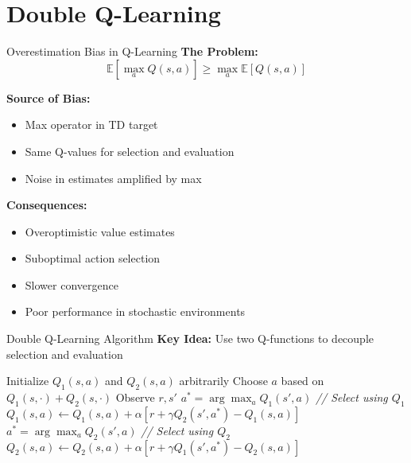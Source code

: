 \documentclass[aspectratio=169,10pt]{beamer}
\begin{document}
\section{Double Q-Learning}

\begin{frame}{Overestimation Bias in Q-Learning}
\textbf{The Problem:}
$$\mathbb{E}[\max_a Q(s,a)] \geq \max_a \mathbb{E}[Q(s,a)]$$

\textbf{Source of Bias:}
\begin{itemize}
    \item Max operator in TD target
    \item Same Q-values for selection and evaluation
    \item Noise in estimates amplified by max
\end{itemize}

\textbf{Consequences:}
\begin{itemize}
    \item Overoptimistic value estimates
    \item Suboptimal action selection
    \item Slower convergence
    \item Poor performance in stochastic environments
\end{itemize}
\end{frame}

\begin{frame}{Double Q-Learning Algorithm}
\textbf{Key Idea:} Use two Q-functions to decouple selection and evaluation

\begin{algorithm}[H]
\caption{Double Q-Learning}
\begin{algorithmic}[1]
\STATE Initialize $Q_1(s,a)$ and $Q_2(s,a)$ arbitrarily
    \STATE Choose $a$ based on $Q_1(s,\cdot) + Q_2(s,\cdot)$
    \STATE Observe $r, s'$
        \STATE $a^* = \arg\max_a Q_1(s',a)$ \textit{// Select using $Q_1$}
        \STATE $Q_1(s,a) \leftarrow Q_1(s,a) + \alpha[r + \gamma Q_2(s',a^*) - Q_1(s,a)]$
    \ELSE
        \STATE $a^* = \arg\max_a Q_2(s',a)$ \textit{// Select using $Q_2$}
        \STATE $Q_2(s,a) \leftarrow Q_2(s,a) + \alpha[r + \gamma Q_1(s',a^*) - Q_2(s,a)]$
    \ENDIF
\ENDFOR
\end{algorithmic}
\end{algorithm}
\end{frame}
\end{document}
